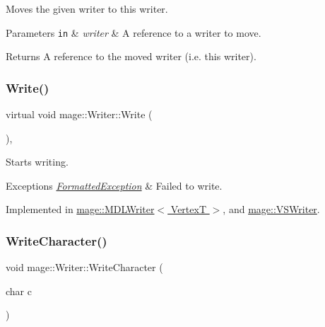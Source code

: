 Moves the given writer to this writer.


\begin{DoxyParams}[1]{Parameters}
\mbox{\tt in}  & {\em writer} & A reference to a writer to move. \\
\hline
\end{DoxyParams}
\begin{DoxyReturn}{Returns}
A reference to the moved writer (i.\+e. this writer). 
\end{DoxyReturn}
\hypertarget{classmage_1_1_writer_a9baf695ef7f6180bef883f60bcb3ac07}{}\label{classmage_1_1_writer_a9baf695ef7f6180bef883f60bcb3ac07} 
\subsubsection{\texorpdfstring{Write()}{Write()}}
{\footnotesize\ttfamily virtual void mage\+::\+Writer\+::\+Write (\begin{DoxyParamCaption}{ }\end{DoxyParamCaption})\hspace{0.3cm}{\ttfamily [private]}, {}}

Starts writing.


\begin{DoxyExceptions}{Exceptions}
{\em \hyperlink{structmage_1_1_formatted_exception}{Formatted\+Exception}} & Failed to write. \\
\hline
\end{DoxyExceptions}


Implemented in \hyperlink{classmage_1_1_m_d_l_writer_aa326a70b449baae2d7db8043e2731327}{mage\+::\+M\+D\+L\+Writer$<$ Vertex\+T $>$}, and \hyperlink{classmage_1_1_v_s_writer_a417c8bcf7ab26e88b253e9ffbdb60192}{mage\+::\+V\+S\+Writer}.

\hypertarget{classmage_1_1_writer_aa1ef04f5e69c44afda56704c2823316c}{}\label{classmage_1_1_writer_aa1ef04f5e69c44afda56704c2823316c} 
\subsubsection{\texorpdfstring{Write\+Character()}{WriteCharacter()}}
{\footnotesize\ttfamily void mage\+::\+Writer\+::\+Write\+Character (\begin{DoxyParamCaption}\item[{char}]{c }\end{DoxyParamCaption})\hspace{0.3cm}{\ttfamily [protected]}}

